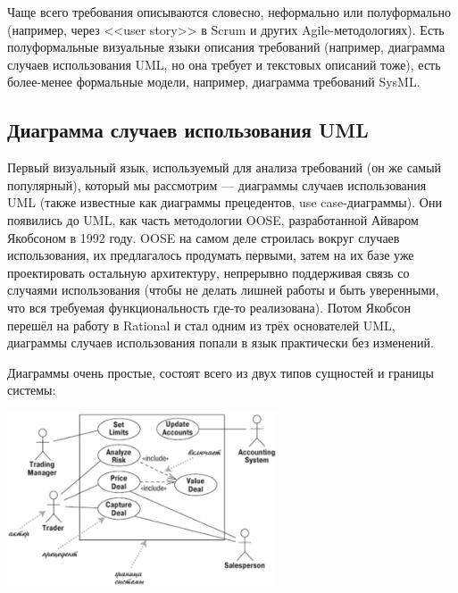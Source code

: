 \documentclass{../../text-style}
\begin{document}
Чаще всего требования описываются словесно, неформально или полуформально (например, через <<user story>> в Scrum и других Agile-методологиях). Есть полуформальные визуальные языки описания требований (например, диаграмма случаев использования UML, но она требует и текстовых описаний тоже), есть более-менее формальные модели, например, диаграмма требований SysML.

\subsection{Диаграмма случаев использования UML}

Первый визуальный язык, используемый для анализа требований (он же самый популярный), который мы рассмотрим --- диаграммы случаев использования UML (также известные как диаграммы прецедентов, use case-диаграммы). Они появились до UML, как часть методологии OOSE, разработанной Айваром Якобсоном в 1992 году. OOSE на самом деле строилась вокруг случаев использования, их предлагалось продумать первыми, затем на их базе уже проектировать остальную архитектуру, непрерывно поддерживая связь со случаями использования (чтобы не делать лишней работы и быть уверенными, что вся требуемая функциональность где-то реализована). Потом Якобсон перешёл на работу в Rational и стал одним из трёх основателей UML, диаграммы случаев использования попали в язык практически без изменений.

Диаграммы очень простые, состоят всего из двух типов сущностей и границы системы:

\begin{center}
    \includegraphics[width=0.6\textwidth]{useCaseDiagram.png}
\end{center}
\end{document}

